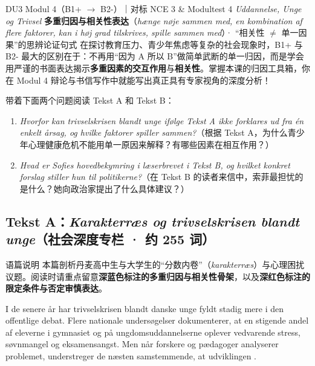 {DU3 Modul 4（B1+ $\rightarrow$ B2-）｜对标 NCE 3 \& Modultest 4 \textit{Uddannelse, Unge og Trivsel}}
{\textbf{多重归因与相关性表达}（\textit{hænge nøje sammen med, en kombination af flere faktorer, kan i høj grad tilskrives, spille sammen med}）· “相关性 $\neq$ 单一因果”的思辨论证句式}
{在探讨教育压力、青少年焦虑等复杂的社会现象时，B1+ 与 B2- 最大的区别在于：不再用“因为 A 所以 B”做简单武断的单一归因，而是学会用严谨的书面表达揭示\textbf{多重因素的交互作用}与\textbf{相关性}。掌握本课的归因工具箱，你在 Modul 4 辩论与书信写作中就能写出真正具有专家视角的深度分析！}

\begin{foerduleaeser}
带着下面两个问题阅读 Tekst A 和 Tekst B：
\begin{enumerate}
  \item \textit{Hvorfor kan trivselskrisen blandt unge ifølge Tekst A ikke forklares ud fra én enkelt årsag, og hvilke faktorer spiller sammen?}（根据 Tekst A，为什么青少年心理健康危机不能用单一原因来解释？有哪些因素在相互作用？）
  \item \textit{Hvad er Sofies hovedbekymring i læserbrevet i Tekst B, og hvilket konkret forslag stiller hun til politikerne?}（在 Tekst B 的读者来信中，索菲最担忧的是什么？她向政治家提出了什么具体建议？）
\end{enumerate}
\end{foerduleaeser}


\subsection*{Tekst A：\textit{Karakterræs og trivselskrisen blandt unge}（社会深度专栏 · 约 255 词）}

\begin{tipbox}{语篇说明}
本篇剖析丹麦高中生与大学生的“分数内卷”（\textit{karakterræs}）与心理困扰议题。阅读时请重点留意\textbf{\color{NCDNavy}深蓝色标注的多重归因与相关性骨架}，以及\textbf{\color{NCDRed}深红色标注的限定条件与否定审慎表达}。
\end{tipbox}

I de senere år har trivselskrisen blandt danske unge fyldt stadig mere i den offentlige debat. Flere nationale undersøgelser dokumenterer, at en stigende andel af eleverne i gymnasiet og på ungdomsuddannelserne oplever vedvarende stress, søvnmangel og eksamensangst. Men når forskere og pædagoger analyserer problemet, understreger de næsten samstemmende, at udviklingen .

